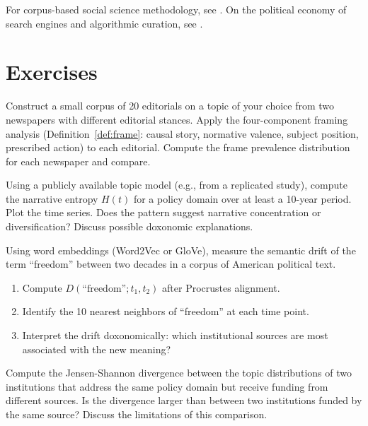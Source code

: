 For corpus-based social science methodology, see \textcite{salganik2018}.
On the political economy of search engines and algorithmic curation, see \textcite{noble2018}.

\section{Exercises}

\begin{exercise}
Construct a small corpus of 20 editorials on a topic of your choice from two newspapers with different editorial stances.
Apply the four-component framing analysis (Definition~\ref{def:frame}: causal story, normative valence, subject position, prescribed action) to each editorial.
Compute the frame prevalence distribution for each newspaper and compare.
\end{exercise}

\begin{exercise}
Using a publicly available topic model (e.g., from a replicated study), compute the narrative entropy $H(t)$ for a policy domain over at least a 10-year period.
Plot the time series.
Does the pattern suggest narrative concentration or diversification?
Discuss possible doxonomic explanations.
\end{exercise}

\begin{exercise}
Using word embeddings (Word2Vec or GloVe), measure the semantic drift of the term ``freedom'' between two decades in a corpus of American political text.
\begin{enumerate}[nosep]
  \item Compute $D(\text{``freedom''}; t_1, t_2)$ after Procrustes alignment.
  \item Identify the 10 nearest neighbors of ``freedom'' at each time point.
  \item Interpret the drift doxonomically: which institutional sources are most associated with the new meaning?
\end{enumerate}
\end{exercise}

\begin{exercise}
Compute the Jensen-Shannon divergence between the topic distributions of two institutions that address the same policy domain but receive funding from different sources.
Is the divergence larger than between two institutions funded by the same source?
Discuss the limitations of this comparison.
\end{exercise}

